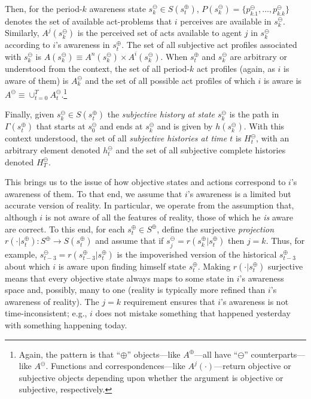 \documentclass[
11pt,
titlepage,
reqno,
]{article}%
\theoremstyle{definition}
\begin{document}
	Then, for the period-$k$ awareness state $s^\ominus_k\in S(s^\oplus_t)$, $P(s^\ominus_k)=\{p^\ominus_{k.1},\ldots,p^\ominus_{k.k}\}$ denotes the set of available act-problems that $i$ perceives are available in $s^\ominus_k$.
	Similarly,  $A^j(s^\ominus_k)$ is the perceived set of acts available to agent $j$  in $s^\ominus_k$ according to $i$'s awareness in  $s^\oplus_t$.
	The set of all subjective act profiles associated with $s^\ominus_k$ is $A(s^\ominus_k)\equiv A^n(s^\ominus_k)\times A^i(s^\ominus_k)$.
	When $s^\oplus_t$ and $s^\ominus_k$ are arbitrary or understood from the context, the set of all period-$k$ act profiles (again, as $i$ is aware of them) is  $A^\ominus_k$ and the set of all possible act profiles of which $i$ is aware is $A^\ominus\equiv \cup_{t=0}^{T} A^\ominus_t$.\footnote
	{
		Again, the pattern is that ``$\oplus$'' objects---like $A^\oplus$---all have ``$\ominus$'' counterparts---like $A^\ominus$. 
		Functions and correspondences---like $A^j(\cdot)$---return objective or subjective objects depending upon whether the argument is objective or subjective, respectively.
	}
	
	Finally, given  $s^\ominus_k\in S(s^\oplus_t)$  the \textit{subjective history at state $s^\ominus_k$} is the path in $\Gamma(s^\oplus_t)$ that starts at $s^\ominus_0$ and ends at $s^\ominus_k$ and is given by $h(s^\ominus_k)$.
	With this context understood, the set of all \textit{subjective histories at time $t$} is $H^\ominus_t$, with an arbitrary element  denoted $h^\ominus_t$  and the set of all subjective complete histories denoted $H^\ominus_T$.
	
	This brings us to the issue of how objective states and actions correspond to $i$'s awareness of them.
	To that end, we assume that $i$'s awareness is a limited but accurate version of reality.
	In particular, we  operate from the assumption that, although $i$ is not aware of all the features of reality,  those of which he \textit{is} aware are correct.  
	To this end, for each $s^\oplus_t\in S^\oplus$, define the surjective \textit{projection} $r(\cdot|s^\oplus_t):S^\oplus\rightarrow S(s^\oplus_t)$ and assume that if $s^\ominus_j=r(s^\oplus_k|s^\oplus_t)$ then $j=k$.
	Thus, for example,  $s^\ominus_{t-3}=r(s^\oplus_{t-3}|s^\oplus_t)$ is the impoverished version of the historical $s^\oplus_{t-3}$ about which $i$ is aware upon finding himself state $s^\oplus_t$.
	Making $r(\cdot|s^\oplus_t)$ surjective means that every objective state always maps to some state in $i$'s awareness space and, possibly, many to one (reality is typically more refined than $i$'s awareness of reality).
	The  $j=k$ requirement ensures that $i$'s awareness is not time-inconsistent; e.g., $i$ does not mistake something that happened yesterday with something happening today.
	
\end{document}
